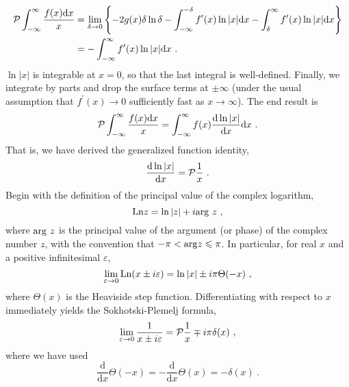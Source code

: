 \documentclass[11pt,a4paper]{article}
\newcommand{\dif}{\mathrm{d}}
\begin{document}
\begin{align*}
{\cal P} \int_{-\infty}^\infty \dfrac{f(x) \dif x}{x} &= \lim_{\delta \rightarrow 0} \left\{-2g(x) \delta \ln \delta -\int_{-\infty}^{-\delta} f^\prime(x) \ln|x| \dif x -\int_\delta^\infty f^\prime(x) \ln|x| \dif x \right\} \\
&= -\int_{-\infty}^\infty f^\prime(x) \ln|x| \dif x ~.
\end{align*}
$\ln|x|$ is integrable at $x = 0$, so that the last integral is well-defined. Finally, we integrate by parts and drop the surface terms at $\pm \infty$ (under the usual assumption that $f^\prime(x) \rightarrow 0$ sufficiently fast as $x \rightarrow \infty$). The end result is
\begin{equation}
{\cal P} \int_{-\infty}^\infty \dfrac{f(x) \dif x}{x} = \int_{-\infty}^\infty f(x) \dfrac{\dif \ln|x|}{\dif x}  \dif x ~.
\end{equation}
That is, we have derived the generalized function identity,
\begin{equation}
\dfrac{\dif \ln|x|}{\dif x} = {\cal P} \dfrac{1}{x} ~.
\end{equation}
Begin with the definition of the principal value of the complex logarithm,
\begin{equation}
{\rm Ln} z = \ln |z| + i {\rm arg}~ z ~,
\end{equation}
where ${\rm arg}~ z$ is the principal value of the argument (or phase) of the complex number $z$, with the convention that $-\pi  < {\rm arg} z \leqslant  \pi$. In particular, for real $x$ and a positive infinitesimal $\varepsilon$,
\begin{equation}
\lim_{\varepsilon \rightarrow 0} {\rm Ln} (x \pm i \varepsilon) = \ln |x| \pm i\pi \Theta (-x) ~,
\end{equation}
where $\Theta(x)$ is the Heaviside step function. Differentiating with respect to $x$ immediately yields the Sokhotski-Plemelj formula,
\begin{equation}
\lim_{\varepsilon \rightarrow 0} \dfrac{1}{x \pm i\varepsilon} = {\cal P} \dfrac{1}{x} \mp i \pi \delta(x) ~,
\end{equation}
where we have used
\begin{equation}
\dfrac{\dif}{\dif x} \Theta(-x) = -\dfrac{\dif}{\dif x} \Theta(x) = -\delta(x) ~.
\end{equation}










\end{document}
